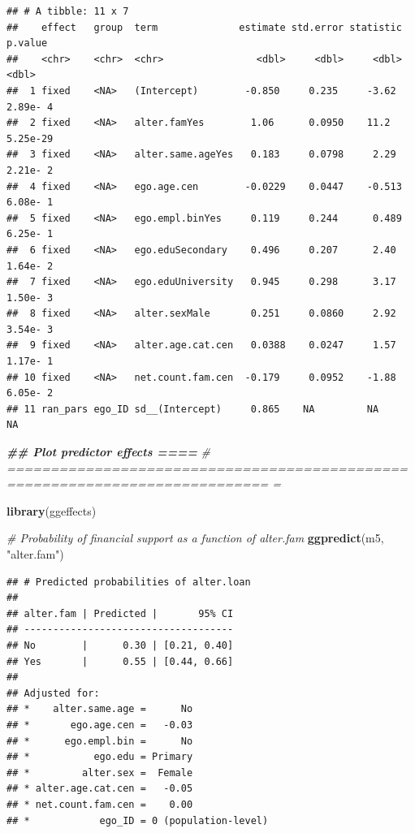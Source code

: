\documentclass[
]{book}
\newenvironment{Shaded}{\begin{snugshade}}{\end{snugshade}}
\newcommand{\CommentTok}[1]{\textcolor[rgb]{0.56,0.35,0.01}{\textit{#1}}}
\newcommand{\DocumentationTok}[1]{\textcolor[rgb]{0.56,0.35,0.01}{\textbf{\textit{#1}}}}
\newcommand{\FunctionTok}[1]{\textcolor[rgb]{0.13,0.29,0.53}{\textbf{#1}}}
\newcommand{\NormalTok}[1]{#1}
\newcommand{\StringTok}[1]{\textcolor[rgb]{0.31,0.60,0.02}{#1}}
\begin{document}
\begin{verbatim}
## # A tibble: 11 x 7
##    effect   group  term              estimate std.error statistic   p.value
##    <chr>    <chr>  <chr>                <dbl>     <dbl>     <dbl>     <dbl>
##  1 fixed    <NA>   (Intercept)        -0.850     0.235     -3.62   2.89e- 4
##  2 fixed    <NA>   alter.famYes        1.06      0.0950    11.2    5.25e-29
##  3 fixed    <NA>   alter.same.ageYes   0.183     0.0798     2.29   2.21e- 2
##  4 fixed    <NA>   ego.age.cen        -0.0229    0.0447    -0.513  6.08e- 1
##  5 fixed    <NA>   ego.empl.binYes     0.119     0.244      0.489  6.25e- 1
##  6 fixed    <NA>   ego.eduSecondary    0.496     0.207      2.40   1.64e- 2
##  7 fixed    <NA>   ego.eduUniversity   0.945     0.298      3.17   1.50e- 3
##  8 fixed    <NA>   alter.sexMale       0.251     0.0860     2.92   3.54e- 3
##  9 fixed    <NA>   alter.age.cat.cen   0.0388    0.0247     1.57   1.17e- 1
## 10 fixed    <NA>   net.count.fam.cen  -0.179     0.0952    -1.88   6.05e- 2
## 11 ran_pars ego_ID sd__(Intercept)     0.865    NA         NA     NA
\end{verbatim}

\begin{Shaded}
\begin{Highlighting}[]
\DocumentationTok{\#\# Plot predictor effects                                                   ====}
\CommentTok{\# ============================================================================ =}

\FunctionTok{library}\NormalTok{(ggeffects)}

\CommentTok{\# Probability of financial support as a function of alter.fam}
\FunctionTok{ggpredict}\NormalTok{(m5, }\StringTok{"alter.fam"}\NormalTok{) }
\end{Highlighting}
\end{Shaded}

\begin{verbatim}
## # Predicted probabilities of alter.loan
## 
## alter.fam | Predicted |       95% CI
## ------------------------------------
## No        |      0.30 | [0.21, 0.40]
## Yes       |      0.55 | [0.44, 0.66]
## 
## Adjusted for:
## *    alter.same.age =      No
## *       ego.age.cen =   -0.03
## *      ego.empl.bin =      No
## *           ego.edu = Primary
## *         alter.sex =  Female
## * alter.age.cat.cen =   -0.05
## * net.count.fam.cen =    0.00
## *            ego_ID = 0 (population-level)
\end{verbatim}
\end{document}
